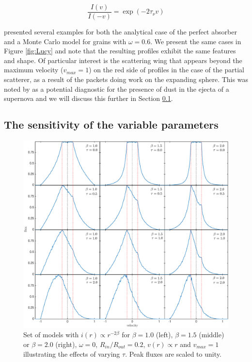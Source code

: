 \documentclass[useAMS,usenatbib,usegraphicx]{mnras}
\begin{document}
\begin{equation}
\frac{I(v)}{I(-v)} = \exp(-2\tau_{\nu} v)  
\end{equation}

\citet{Lucy1989} presented several examples for both the analytical case of 
the perfect absorber and a Monte Carlo model for grains with $\omega 
=0.6$.  We present the same cases in Figure \ref{fig:Lucy} and note that 
the resulting profiles exhibit the same features and shape. Of particular 
interest is the scattering wing that appears beyond the maximum velocity 
($v_{max}=1$) on the red side of profiles in the case of the partial 
scatterer, as a result of the packets doing work on the expanding sphere.  
This was noted by \citet{Lucy1989} as a potential diagnostic for the 
presence of dust in the ejecta of a supernova and we will discuss this 
further in Section \ref{ps}.


\subsection{The sensitivity of the variable parameters}
\label{ps}

\begin{figure}
\includegraphics[trim =80 10 6 15,clip=true,scale=0.515]{params/D/newDall} 
\caption{Set of models with $i(r) \propto r^{-2\beta}$ for $\beta=1.0$ (left), $\beta=1.5$ (middle) or $\beta=2.0$ (right), $\omega=0$, 
$R_{in}/R_{out}=0.2$, $v(r) \propto r$ and $v_{max}=1$ illustrating the effects of varying 
$\tau$.  Peak fluxes are scaled to unity.}
\label{bt}
\end{figure}
\end{document}

